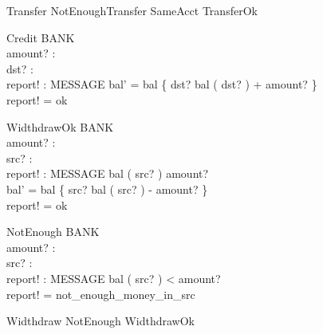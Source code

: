 \begin{zed}
Transfer \sdef  NotEnoughTransfer \lor  SameAcct \lor   TransferOk
\end{zed}




\begin{schema}{Credit}
\Delta BANK \\ 
amount? : \nat  \\ 
dst? : \nat \\
report! : MESSAGE 
\where
bal' = bal \oplus \{ dst? \map bal ( dst? ) + amount? \} \\
report! = ok 
\end{schema}



\begin{schema}{WidthdrawOk}
\Delta BANK \\ 
amount? : \nat  \\ 
src? : \nat \\
report! : MESSAGE 
\where
bal ( src? ) \geq amount? \\
bal' = bal \oplus \{ src? \map bal ( src? ) - amount? \} \\
report! = ok 
\end{schema}

\begin{schema}{NotEnough}
\Xi BANK \\ 
amount? : \nat  \\ 
src? : \nat \\ 
report! : MESSAGE 
\where
bal ( src? ) < amount? \\
report! = not\_enough\_money\_in\_src 
\end{schema}

\begin{zed}
Widthdraw \sdef NotEnough \lor   WidthdrawOk
\end{zed}



